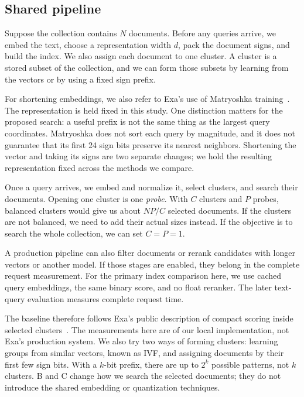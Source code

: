 \subsection{Shared pipeline}
Suppose the collection contains $N$ documents. Before any queries arrive, we embed the text,
choose a representation width $d$, pack the document signs, and build the index. We also assign
each document to one cluster. A cluster is a stored subset of the collection, and we can form
those subsets by learning from the vectors or by using a fixed sign prefix.

For shortening embeddings, we also refer to Exa's use of Matryoshka training~\cite{exa,mrl}.
The representation is held fixed in this study. One distinction matters for the proposed search:
a useful prefix is not the same thing as the largest query coordinates. Matryoshka does not
sort each query by magnitude, and it does not guarantee that its first 24 sign bits preserve
its nearest neighbors. Shortening the vector and taking its signs are two separate changes;
we hold the resulting representation fixed across the methods we compare.

Once a query arrives, we embed and normalize it, select clusters, and search their documents.
Opening one cluster is one \emph{probe}. With $C$ clusters and $P$ probes, balanced clusters
would give us about $NP/C$ selected documents. If the clusters are not balanced, we need to
add their actual sizes instead. If the objective is to search the whole collection, we can set
$C=P=1$.


A production pipeline can also filter documents or rerank candidates with longer vectors or
another model. If those stages are enabled, they belong in the complete request measurement.
For the primary index comparison here, we use cached query embeddings, the same binary score,
and no float reranker. The later text-query evaluation measures complete request time.

The baseline therefore follows Exa's public description of compact scoring inside selected
clusters~\cite{exa}. The measurements here are of our local implementation, not Exa's production
system. We also try two ways of forming clusters: learning groups from similar vectors,
known as IVF, and assigning documents by their first few sign bits. With a $k$-bit prefix,
there are up to $2^k$ possible patterns, not $k$ clusters. B and C change how we search the
selected documents; they do not introduce the shared embedding or quantization techniques.